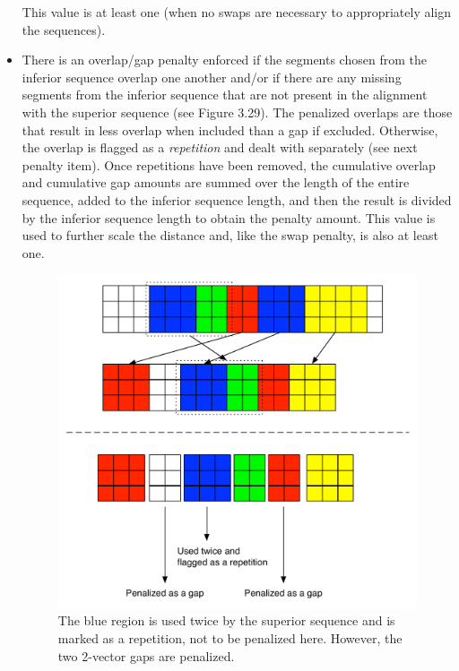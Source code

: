 \documentclass[12pt]{report} 	%
\numberwithin{figure}{chapter}
\numberwithin{table}{chapter}
\numberwithin{equation}{chapter}
\begin{document}
\begin{flushleft}
\begin{itemize}
\begin{figure}[h!]
\begin{center}
\end{center}
\end{figure}
This value is at least one (when no swaps are necessary to appropriately align the sequences). 
\item There is an overlap/gap penalty enforced if the segments chosen from the inferior sequence overlap one another and/or if there are any missing segments from the inferior sequence that are not present in the alignment with the superior sequence (see Figure 3.29). The penalized overlaps are those that result in less overlap when included than a gap if excluded. Otherwise, the overlap is flagged as a \textit{repetition} and dealt with separately (see next penalty item). Once repetitions have been removed, the cumulative overlap and cumulative gap amounts are summed over the length of the entire sequence, added to the inferior sequence length, and then the result is divided by the inferior sequence length to obtain the penalty amount. This value is used to further scale the distance and, like the swap penalty, is also at least one.
\begin{figure}[h!]
\begin{center}
\includegraphics[scale=0.7]{Penalty_2}
\caption[Penalizing overlaps and gaps]{The blue region is used twice by the superior sequence and is marked as a repetition, not to be penalized here. However, the two 2-vector gaps are penalized.}
\end{center}

\end{figure}
\end{itemize}
\end{flushleft}
\end{document}
